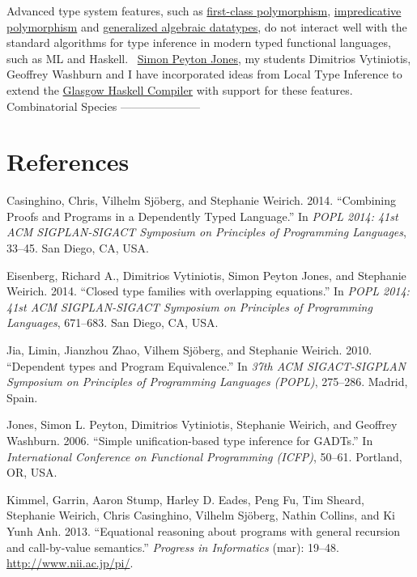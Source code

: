 \documentclass[]{article}
\begin{document}
Advanced type system features, such as
\href{papers/putting.pdf}{first-class polymorphism},
\href{http://www.seas.upenn.edu/\%7Esweirich/papers/icfp08.pdf}{impredicative
polymorphism} and
\href{http://www.seas.upenn.edu/\%7Esweirich/papers/gadt.pdf}{generalized
algebraic datatypes}, do not interact well with the standard algorithms
for type inference in modern typed functional languages, such as ML and
Haskell.~ \href{http://research.microsoft.com/\%7Esimonpj/}{Simon Peyton
Jones}, my students Dimitrios Vytiniotis, Geoffrey Washburn and I have
incorporated ideas from Local Type Inference to extend the
\href{http://www.haskell.org/ghc/}{Glasgow Haskell Compiler} with
support for these features. \\ Combinatorial Species
---------------------

\section{References}

Casinghino, Chris, Vilhelm Sjöberg, and Stephanie Weirich. 2014.
``Combining Proofs and Programs in a Dependently Typed Language.'' In
\emph{POPL 2014: 41st ACM SIGPLAN-SIGACT Symposium on Principles of
Programming Languages}, 33--45. San Diego, CA, USA.

Eisenberg, Richard A., Dimitrios Vytiniotis, Simon Peyton Jones, and
Stephanie Weirich. 2014. ``Closed type families with overlapping
equations.'' In \emph{POPL 2014: 41st ACM SIGPLAN-SIGACT Symposium on
Principles of Programming Languages}, 671--683. San Diego, CA, USA.

Jia, Limin, Jianzhou Zhao, Vilhem Sjöberg, and Stephanie Weirich. 2010.
``Dependent types and Program Equivalence.'' In \emph{37th ACM
SIGACT-SIGPLAN Symposium on Principles of Programming Languages (POPL)},
275--286. Madrid, Spain.

Jones, Simon L. Peyton, Dimitrios Vytiniotis, Stephanie Weirich, and
Geoffrey Washburn. 2006. ``Simple unification-based type inference for
GADTs.'' In \emph{International Conference on Functional Programming
(ICFP)}, 50--61. Portland, OR, USA.

Kimmel, Garrin, Aaron Stump, Harley D. Eades, Peng Fu, Tim Sheard,
Stephanie Weirich, Chris Casinghino, Vilhelm Sjöberg, Nathin Collins,
and Ki Yunh Anh. 2013. ``Equational reasoning about programs with
general recursion and call-by-value semantics.'' \emph{Progress in
Informatics} (mar): 19--48.
\href{http://www.nii.ac.jp/pi/}{http://www.nii.ac.jp/pi/}.
\end{document}
